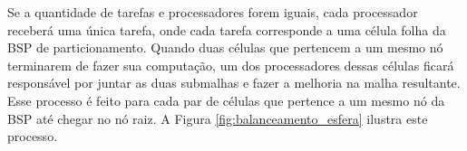 Se a quantidade de tarefas e processadores forem iguais, cada processador receberá uma única tarefa, onde cada tarefa corresponde a uma célula folha da BSP de particionamento. Quando duas células que pertencem a um mesmo nó terminarem de fazer sua computação, um dos processadores dessas células ficará responsável por juntar as duas submalhas e fazer a melhoria na malha resultante. Esse processo é feito para cada par de células que pertence a um mesmo nó da BSP até chegar no nó raiz. A Figura \ref{fig:balanceamento_esfera} ilustra este processo.


\begin{figure}[!ht]
	\centering    
	\qquad
\end{figure}
